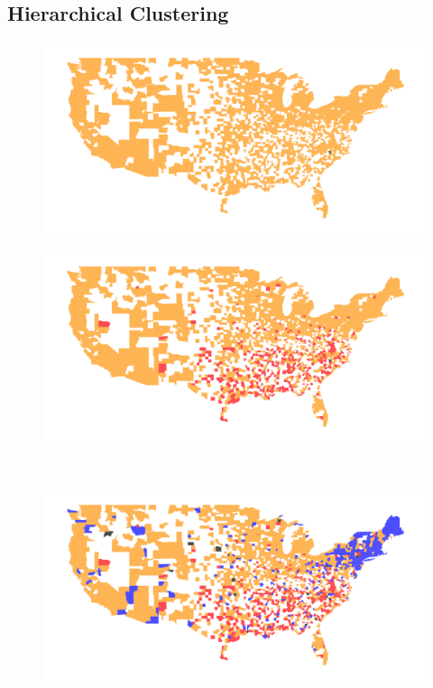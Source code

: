 \subsection{Hierarchical Clustering}
\begin{figure}
  \begin{minipage}[b]{0.5\columnwidth}
    \centering
    \includegraphics[width=\columnwidth]{fig/hierarchical1.png}
    \label{subfig:hierarchy1}   
  \end{minipage}
  \begin{minipage}[b]{0.5\columnwidth}
    \centering
    \includegraphics[width=\columnwidth]{fig/hierarchical2.png}
    \label{subfig:hierarchy2}
  \end{minipage}\\
  \begin{minipage}[b]{0.5\columnwidth}
    \centering
    \includegraphics[width=\columnwidth]{fig/hierarchical3.png}

\end{minipage}
\end{figure}
